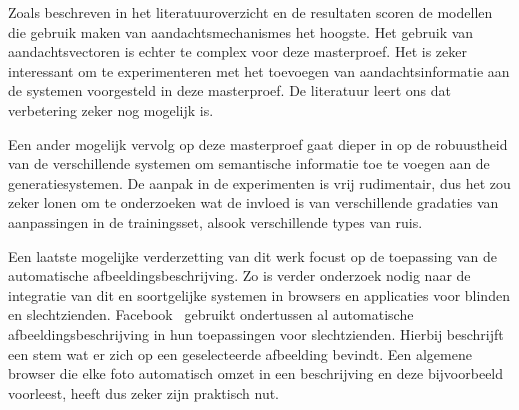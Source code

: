 Zoals beschreven in het literatuuroverzicht en de resultaten scoren de modellen die gebruik maken van aandachtsmechanismes het hoogste. Het gebruik van aandachtsvectoren is echter te complex voor deze masterproef. Het is zeker interessant om te experimenteren met het toevoegen van aandachtsinformatie aan de systemen voorgesteld in deze masterproef. De literatuur leert ons dat verbetering zeker nog mogelijk is. 

Een ander mogelijk vervolg op deze masterproef gaat dieper in op de robuustheid van de verschillende systemen om semantische informatie toe te voegen aan de generatiesystemen.
De aanpak in de experimenten is vrij rudimentair, dus het zou zeker lonen om te onderzoeken wat de invloed is van verschillende gradaties van aanpassingen in de trainingsset, alsook verschillende types van ruis.

Een laatste mogelijke verderzetting van dit werk focust op de toepassing van de automatische afbeeldingsbeschrijving. 
Zo is verder onderzoek nodig naar de integratie van dit en soortgelijke systemen in browsers en applicaties voor blinden en slechtzienden. Facebook~\cite{facebook} gebruikt ondertussen al automatische afbeeldingsbeschrijving in hun toepassingen voor slechtzienden. Hierbij beschrijft een stem wat er zich op een geselecteerde afbeelding bevindt. Een algemene browser die elke foto automatisch omzet in een beschrijving en deze bijvoorbeeld voorleest, heeft dus zeker zijn praktisch nut.

